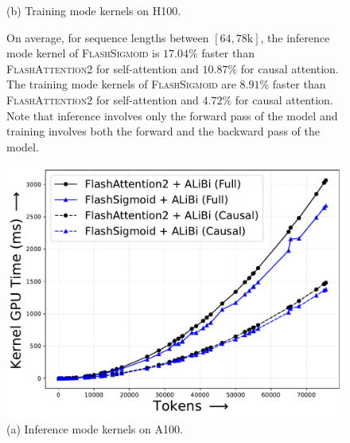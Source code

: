\begin{figure}[!htbp]
\begin{minipage}{0.46\textwidth}
        \captionsetup{justification=centering} 
        \caption*{
            (b) Training mode kernels on H100. 
        }
    \end{minipage}
    \caption{
        On average, for sequence lengths between $[64, 78\mathrm{k}]$, the inference mode kernel of \textsc{FlashSigmoid} is ${17.04}\%$ faster than \textsc{FlashAttention2} for self-attention and ${10.87}\%$ for causal attention.
        The training mode kernels of \textsc{FlashSigmoid} are ${8.91}\%$ faster than \textsc{FlashAttention2} for self-attention and ${4.72}\%$ for causal attention.
        Note that inference involves only the forward pass of the model and training involves both the forward and the backward pass of the model.
    }
    \label{fig:h100-softmax_alibi-sigmoid_alibi-fwd_bwd}
\end{figure}
\begin{figure}[!htbp]
    \centering
    \begin{minipage}{0.46\textwidth}
        \footnotesize
        \centering
        \includegraphics[trim={0 0 0 0}, width=\textwidth]{figures/_flash_figures/final_arxiv/f4/a100/A100_alibi_FWD_Full_12.28_0.1_Causal_5.3_0.07.pdf}
        \captionsetup{justification=centering}
        \caption*{
            (a) Inference mode kernels on A100. 
        }
    \end{minipage}
    \hfill
    \begin{minipage}{0.46\textwidth}
        \centering        

\end{minipage}
\end{figure}
